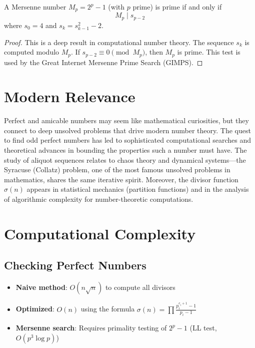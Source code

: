 \begin{theorem}
A Mersenne number $M_p = 2^p - 1$ (with $p$ prime) is prime if and only if
\[
M_p \mid s_{p-2}
\]
where $s_0 = 4$ and $s_{k} = s_{k-1}^2 - 2$.
\end{theorem}

\begin{proof}
This is a deep result in computational number theory. The sequence $s_k$ is computed modulo $M_p$. If $s_{p-2} \equiv 0 \pmod{M_p}$, then $M_p$ is prime. This test is used by the Great Internet Mersenne Prime Search (GIMPS).
\end{proof}

\section{Modern Relevance}

Perfect and amicable numbers may seem like mathematical curiosities, but they connect to deep unsolved problems that drive modern number theory. The quest to find odd perfect numbers has led to sophisticated computational searches and theoretical advances in bounding the properties such a number must have. The study of aliquot sequences relates to chaos theory and dynamical systems---the Syracuse (Collatz) problem, one of the most famous unsolved problems in mathematics, shares the same iterative spirit. Moreover, the divisor function $\sigma(n)$ appears in statistical mechanics (partition functions) and in the analysis of algorithmic complexity for number-theoretic computations.

\section{Computational Complexity}

\subsection{Checking Perfect Numbers}
\begin{itemize}
    \item \textbf{Naive method}: $O(n\sqrt{n})$ to compute all divisors
    \item \textbf{Optimized}: $O(n)$ using the formula $\sigma(n) = \prod \frac{p_i^{e_i+1}-1}{p_i-1}$
    \item \textbf{Mersenne search}: Requires primality testing of $2^p - 1$ (LL test, $O(p^3 \log p)$)
\end{itemize}

